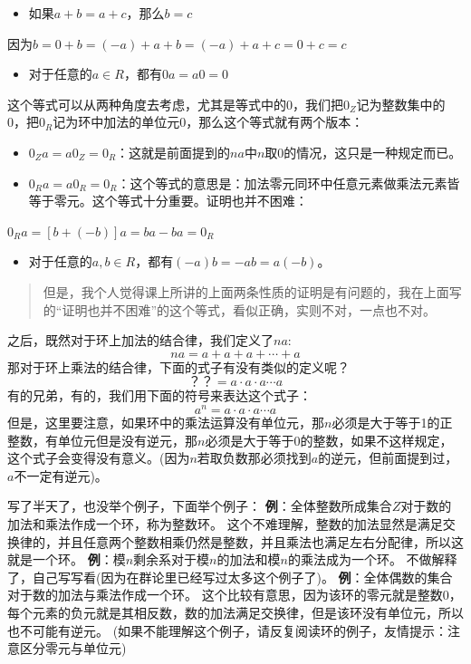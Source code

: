 \documentclass[12pt, a4paper, oneside]{ctexart}
\newenvironment{myquote}{\begin{quote}\small\color{gray}}{\end{quote}}
\begin{document}
\begin{itemize}[leftmargin=*]
\item 如果$a+b=a+c$，那么$b=c$
\end{itemize}

因为$b=0+b=(-a)+a+b=(-a)+a+c=0+c=c$
\begin{itemize}[leftmargin=*]
\item 对于任意的$a\in R$，都有$0a=a0=0$
\end{itemize}

这个等式可以从两种角度去考虑，尤其是等式中的0，我们把$0_Z$记为整数集中的0，把$0_R$记为环中加法的单位元0，那么这个等式就有两个版本：
\begin{itemize}[leftmargin=*]
\item $0_Za=a0_Z=0_R$：这就是前面提到的$na$中$n$取0的情况，这只是一种规定而已。
\item $0_Ra=a0_R=0_R$：这个等式的意思是：加法零元同环中任意元素做乘法元素皆等于零元。这个等式十分重要。证明也并不困难：
\end{itemize}

$0_Ra=[b+(-b)]a=ba-ba=0_R$

\begin{itemize}[leftmargin=*]
\item 对于任意的$a,b\in R$，都有$(-a)b=-ab=a(-b)$。
\end{itemize}

\begin{myquote}
但是，我个人觉得课上所讲的上面两条性质的证明是有问题的，我在上面写的“证明也并不困难”的这个等式，看似正确，实则不对，一点也不对。
\end{myquote}

之后，既然对于环上加法的结合律，我们定义了$na$:
\[
na=a+a+a+\cdots+a
\]
那对于环上乘法的结合律，下面的式子有没有类似的定义呢？
\[
？？=a\cdot a\cdot a\cdots a
\]
有的兄弟，有的，我们用下面的符号来表达这个式子：
\[
a^n=a\cdot a\cdot a\cdots a
\]
但是，这里要注意，如果环中的乘法运算没有单位元，那$n$必须是大于等于1的正整数，有单位元但是没有逆元，那$n$必须是大于等于0的整数，如果不这样规定，这个式子会变得没有意义。(因为$n$若取负数那必须找到$a$的逆元，但前面提到过，$a$不一定有逆元)。

写了半天了，也没举个例子，下面举个例子：
\textbf{例}：全体整数所成集合$Z$对于数的加法和乘法作成一个环，称为整数环。
这个不难理解，整数的加法显然是满足交换律的，并且任意两个整数相乘仍然是整数，并且乘法也满足左右分配律，所以这就是一个环。
\textbf{例}：模$n$剩余系对于模$n$的加法和模$n$的乘法成为一个环。
不做解释了，自己写写看(因为在群论里已经写过太多这个例子了)。
\textbf{例}：全体偶数的集合对于数的加法与乘法作成一个环。
这个比较有意思，因为该环的零元就是整数0，每个元素的负元就是其相反数，数的加法满足交换律，但是该环没有单位元，所以也不可能有逆元。
(如果不能理解这个例子，请反复阅读环的例子，友情提示：注意区分零元与单位元)
\end{document}

